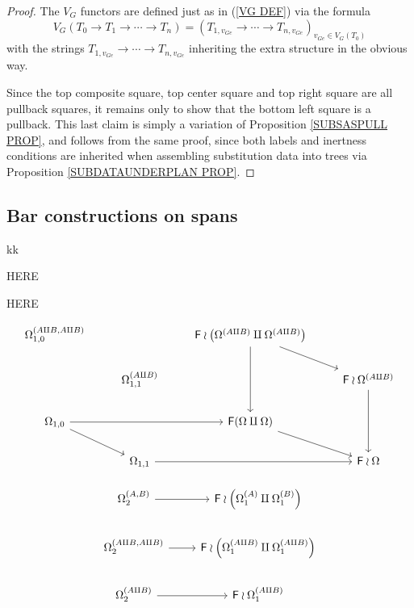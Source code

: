 \documentclass[a4paper,10pt]{article}%
\begin{document}
\begin{proof}
	The $V_G$ functors are defined just as in (\ref{VG DEF}) via the formula
	\[
	V_G(T_0 \to T_1 \to \cdots \to T_n) = 
	(T_{1,v_{Ge}} \to \cdots \to
	T_{n,v_{Ge}})_{v_{Ge} \in V_G(T_0)}\]
with the strings 
$T_{1,v_{Ge}} \to \cdots \to T_{n,v_{Ge}}$
inheriting the extra structure in the obvious way.

Since the top composite square, top center square and top right square are all pullback squares, it remains only to show that the bottom left square is a pullback.
This last claim is simply a variation of Proposition \ref{SUBSASPULL PROP}, and follows from the same proof, since both labels and inertness conditions are inherited when assembling substitution data into trees via Proposition \ref{SUBDATAUNDERPLAN PROP}.
\end{proof}


\subsection{Bar constructions on spans}

kk


{\color{red} HERE}


{\color{green} HERE}













\[
\begin{tikzcd}
	\Omega_{1,0}^{(A \amalg B, A \amalg B)} &&
	\Fin \wr \left( \Omega^{(A \amalg B)} \amalg \Omega^{(A \amalg B)} \right) \ar{rd} \ar{dd}
\\
	&\Omega_{1,1}^{(A \amalg B)}&
	& \Fin \wr \Omega^{(A \amalg B)} \ar{dd}
\\
	\Omega_{1,0} \ar{rr} \ar{rd} &&
	\Fin (\Omega \amalg \Omega) \ar{rd}
\\
	& \Omega_{1,1} \ar{rr} &
	& \Fin \wr \Omega
\end{tikzcd}
\]

\[
\begin{tikzcd}
	\Omega_2^{(A,B)} \ar{r} &
	\Fin \wr \left( \Omega_1^{(A)} \amalg \Omega_1^{(B)} \right)
\\
	\Omega_2^{(A\amalg B, A \amalg B)} \ar{r} &
	\Fin \wr \left( \Omega_1^{(A\amalg B)} \amalg \Omega_1^{(A \amalg B)} \right)
\\
	\Omega_2^{(A \amalg B)} \ar{r} &
	\Fin \wr \Omega_1^{(A \amalg B)} 
\end{tikzcd}
\]
\end{document}
